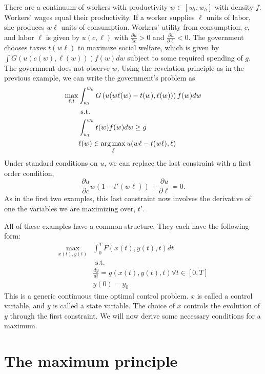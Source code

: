 \begin{example}
  There are a continuum of workers with productivity $w \in [w_l,w_h]$
  with density $f$. Workers' wages equal their productivity. If a
  worker supplies $\ell$ units of labor, she produces $w \ell$ units
  of consumption. Workers' utility from consumption, $c$, and labor
  $\ell$ is given by $u(c,\ell)$ with $\frac{\partial u}{\partial c} >
  0$ and $\frac{\partial u}{\partial \ell} < 0$. The government
  chooses taxes $t(w\ell)$ to maximize social welfare, which is given
  by $\int G(u(c(w),\ell(w))) f(w) dw$ subject to some required
  spending of $g$. The government does
  not observe $w$. Using the revelation principle as in the previous
  example, we can write the government's problem as
  \begin{align*}
    \max_{\ell,t} &  \int_{w_l}^{w_h} G\left(u(w\ell(w) - t(w),\ell(w))
    \right) f(w) dw \\
    & \text{ s.t. } \\
    & \int_{w_l}^{w_h} t(w) f(w) dw \geq g \\
    & \ell(w) \in \argmax_{\tilde{\ell}} u(w\ell - t(w\ell), \ell )
  \end{align*}  
  Under standard conditions on $u$, we can replace the last constraint
  with a first order condition,
  \[ \frac{\partial u}{\partial c} w\left(1 - t'(w\ell)\right) +
  \frac{\partial u}{\partial \ell} = 0. \]
  As in the first two examples, this last constraint now involves the
  derivative of one the variables we are maximizing over, $t'$.
\end{example}

All of these examples have a common structure. They each have the
following form:
\begin{align*}
  \max_{x(t),y(t)} & \int_0^T F(x(t),y(t),t) dt \\
  & \text{ s.t.} \\
  & \frac{d y}{dt} = g(x(t),y(t),t) \forall t \in [0,T] \\ 
  & y(0) = y_0
\end{align*}
This is a generic continuous time optimal control problem. 
$x$ is called a control variable, and $y$ is called a state
variable. The choice of $x$ controls the evolution of $y$ through the
first constraint. We will now derive some necessary conditions for a
maximum. 

\section{The maximum principle}

